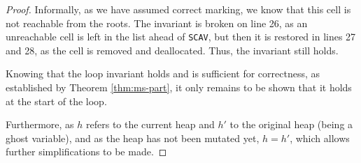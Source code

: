 \begin{proof}
  Informally, as we have assumed correct marking, we know that this
  cell is not reachable from the roots. The invariant is broken on
  line 26, as an unreachable cell is left in the list ahead of
  \texttt{SCAV}, but then it is restored in lines 27 and 28, as the
  cell is removed and deallocated. Thus, the invariant still holds.

  Knowing that the loop invariant holds and is sufficient for
  correctness, as established by Theorem \ref{thm:ms-part}, it only
  remains to be shown that it holds at the start of the loop.

  \begin{prooftree}
  \end{prooftree}

  Furthermore, as $h$ refers to the current heap and $h'$ to the
  original heap (being a ghost variable), and as the heap has not been
  mutated yet, $h = h'$, which allows further simplifications to be
  made.


\end{proof}
